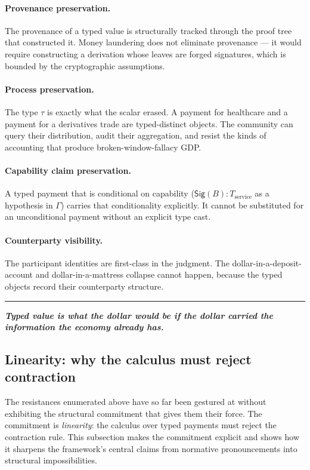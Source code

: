 \documentclass[11pt]{article}
\newcommand{\position}[1]{%
  \medskip
  \begin{quoting}[indentfirst=false, leftmargin=1em, rightmargin=1em]
  \noindent\textcolor{rhosky}{\rule{3pt}{1.2em}}\hspace{0.5em}\textbf{\textit{#1}}
  \end{quoting}
  \medskip
}
\newcommand{\Sig}{\mathsf{Sig}}
\begin{document}
\paragraph{Provenance preservation.} The provenance of a typed value is structurally tracked through the proof tree that constructed it. Money laundering does not eliminate provenance --- it would require constructing a derivation whose leaves are forged signatures, which is bounded by the cryptographic assumptions.

\paragraph{Process preservation.} The type $\tau$ is exactly what the scalar erased. A payment for healthcare and a payment for a derivatives trade are typed-distinct objects. The community can query their distribution, audit their aggregation, and resist the kinds of accounting that produce broken-window-fallacy GDP.

\paragraph{Capability claim preservation.} A typed payment that is conditional on capability ($\Sig(B) : T_{\text{service}}$ as a hypothesis in $\Gamma$) carries that conditionality explicitly. It cannot be substituted for an unconditional payment without an explicit type cast.

\paragraph{Counterparty visibility.} The participant identities are first-class in the judgment. The dollar-in-a-deposit-account and dollar-in-a-mattress collapse cannot happen, because the typed objects record their counterparty structure.

\position{Typed value is what the dollar would be if the dollar carried the information the economy already has.}

\subsection{Linearity: why the calculus must reject contraction}\label{sec:linearity}

The resistances enumerated above have so far been gestured at without exhibiting the structural commitment that gives them their force. The commitment is \emph{linearity}: the calculus over typed payments must reject the contraction rule. This subsection makes the commitment explicit and shows how it sharpens the framework's central claims from normative pronouncements into structural impossibilities.
\end{document}
